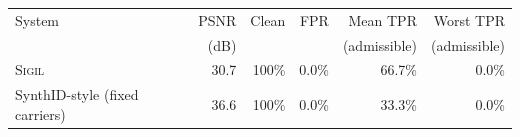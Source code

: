 \begin{tabular}{lrrrrr}
\toprule
System & PSNR & Clean & FPR & Mean TPR & Worst TPR \\
& (dB) & & & (admissible) & (admissible) \\
\midrule
\textsc{Sigil} & 30.7 & 100\% & 0.0\% & 66.7\% & 0.0\% \\
SynthID-style (fixed carriers) & 36.6 & 100\% & 0.0\% & 33.3\% & 0.0\% \\
\bottomrule
\end{tabular}

